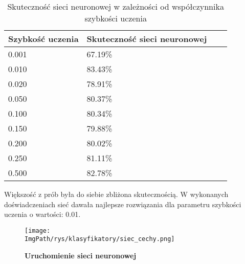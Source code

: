 \documentclass[a4paper,12pt,twoside,openany]{report}
\newcommand{\ImgPath}{.}
\begin{document}
		\begin{table}[H]
		\centering
		\begin{tabularx}{\textwidth}{|X|X|X|X|}
			\hline
			\textbf{Szybkość uczenia} & \textbf{Skuteczność sieci neuronowej}    \\ 
			
			\hline
			0.001 & 67.19\% \\ 
			
			\hline
			0.010 & 83.43\% \\
			
			\hline
			0.020 & 78.91\% \\
			
			\hline
			0.050 & 80.37\% \\
			
			\hline
			0.100 & 80.34\% \\
			
			\hline
			0.150 & 79.88\% \\
			
			\hline
			0.200 & 80.02\% \\
			
			\hline
			0.250 & 81.11\% \\
			
			\hline
			0.500 & 82.78\% \\
			\hline
		\end{tabularx}
		
		\caption{Skuteczność sieci neuronowej w zależności od współczynnika szybkości uczenia}
	\end{table}

	Większość z prób była do siebie zbliżona skutecznością. W wykonanych doświadczeniach sieć dawała najlepsze rozwiązania dla parametru szybkości uczenia o wartości: 0.01.
	
	\begin{figure}[H]
		\centering
		{\label{fig:b}\texttt{[image: \\ImgPath/rys/klasyfikatory/siec\_cechy.png]}}
		\caption{  \textbf{Uruchomienie sieci neuronowej}}
	\end{figure}
\end{document}
